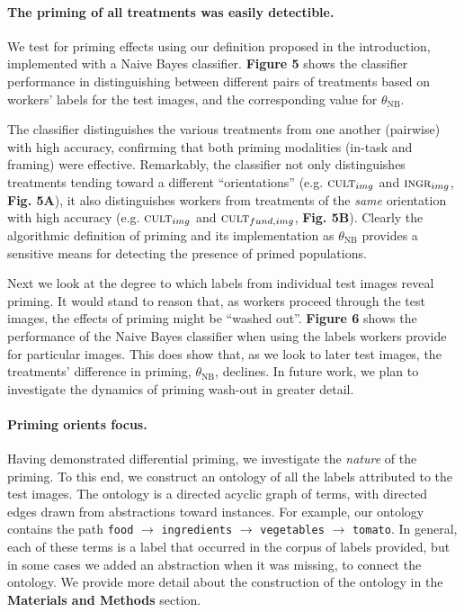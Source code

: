 \documentclass[a4paper]{report}
\begin{document}
\paragraph{The priming of all treatments was easily detectible.}
We test for priming effects using our definition proposed in the introduction,
implemented with a Naive Bayes classifier.  \textbf{Figure 5} shows
the classifier performance in distinguishing between different pairs of 
treatments based on workers' labels for the test images, and the corresponding
value for $\theta_\text{NB}$.

The classifier distinguishes the various treatments from one another (pairwise)
with high accuracy, confirming that both priming modalities 
(in-task and framing) were effective.  Remarkably, the classifier not only 
distinguishes treatments tending toward a different ``orientations'' 
(e.g. $\textsc{cult}_{img}$ and $\textsc{ingr}_{img}$, \textbf{Fig. 5A}), 
it also distinguishes workers from treatments of the \textit{same} 
orientation with high accuracy 
(e.g. $\textsc{cult}_{img}$ and $\textsc{cult}_{fund, img}$, \textbf{Fig. 5B}).
Clearly the algorithmic definition of priming and its implementation as 
$\theta_\text{NB}$ provides a sensitive means for detecting the presence of
primed populations. 

Next we look at the degree to which labels from individual test images reveal 
priming.  It would stand to reason that, as workers proceed through 
the test images, the effects of priming might be ``washed out''.  
\textbf{Figure 6} shows the
performance of the Naive Bayes classifier when using the labels workers provide
for particular images.  This does show that, as we look to later test images, 
the treatments' difference in priming, $\theta_\text{NB}$, declines.  In future
work, we plan to investigate the dynamics of priming wash-out in greater 
detail.

\paragraph{Priming orients focus.} Having demonstrated differential 
priming, we investigate the \textit{nature} of the priming.  To this
end, we construct an ontology of all the labels attributed to
the test images.  The ontology is a directed acyclic graph of terms,
with directed edges drawn from abstractions toward instances.  For example,
our ontology contains the path \texttt{food} $\to$ \texttt{ingredients} $\to$ 
\texttt{vegetables} 
$\to$ \texttt{tomato}.  In general, each of these terms is a label that
occurred in the corpus of labels provided, but in some cases we added 
an abstraction when it was missing, to connect the ontology.  We provide more
detail about the construction of the ontology in the 
\textbf{Materials and Methods} section.
\end{document}
